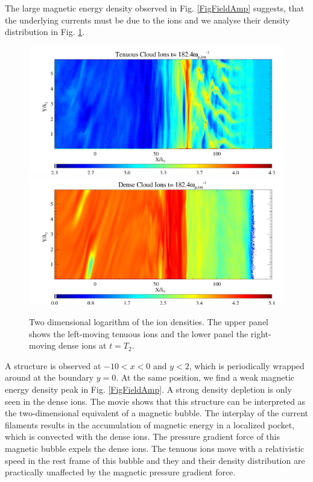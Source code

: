 \documentclass[structabstract]{aa}
\begin{document}
The large magnetic energy density observed in Fig. \ref{FigFieldAmp} suggests, that the underlying currents
must be due to the ions and we analyse their density distribution in Fig. \ref{FigIonLeftRightT2}. 
\begin{figure}
\centering
\includegraphics[width=\columnwidth]{1529413a.png}
\includegraphics[width=\columnwidth]{1529413b.png}
\caption{Two dimensional logarithm of the ion densities. The upper panel 
shows the left-moving tenuous ions and the lower panel the right-moving 
dense ions at $t=T_2$.}
\label{FigIonLeftRightT2}
\end{figure}
A structure is observed at $-10<x<0$ and $y<2$, which is periodically wrapped around at the boundary $y=0$.
At the same position, we find a weak magnetic energy density peak in Fig. \ref{FigFieldAmp}. A strong 
density depletion is only seen in the dense ions. The movie shows that this structure can be interpreted
as the two-dimensional equivalent of a magnetic bubble. The interplay of the current filaments results in
the accumulation of magnetic energy in a localized pocket, which is convected with the dense ions. The 
pressure gradient force of this magnetic bubble expels the dense ions. The tenuous ions move with a 
relativistic speed in the rest frame of this bubble and they and their density distribution are practically 
unaffected by the magnetic pressure gradient force.
\end{document}
